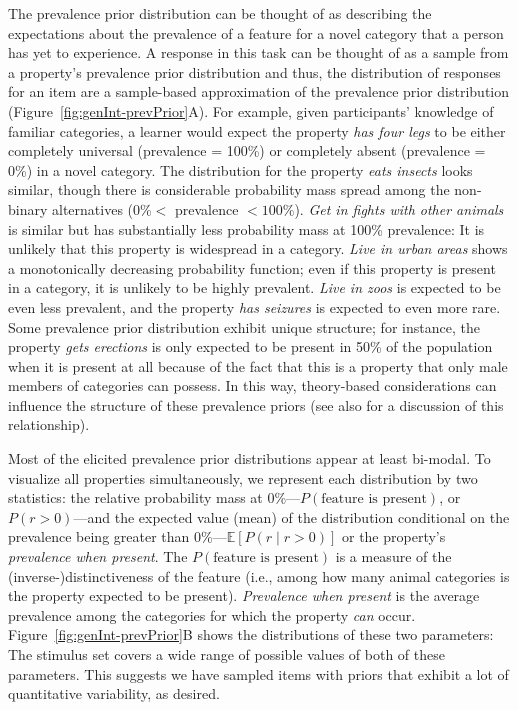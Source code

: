 \documentclass[floatsintext,doc]{apa6}
\begin{document}
The prevalence prior distribution can be thought of as describing the expectations about the prevalence of a feature for a novel category that a person has yet to experience. 
A response in this task can be thought of as a sample from a property's prevalence prior distribution and thus, the distribution of responses for an item are a sample-based approximation of the prevalence prior distribution (Figure~\ref{fig:genInt-prevPrior}A). 
For example, given participants' knowledge of familiar categories, a learner would expect the property \emph{has four legs} to be either completely universal (prevalence = 100\%) or completely absent (prevalence = 0\%) in a novel category.
The distribution for the property \emph{eats insects} looks similar, though there is considerable probability mass spread among the non-binary alternatives (\(0\% <\) prevalence \(< 100\%\)).
\emph{Get in fights with other animals} is similar but has substantially less probability mass at 100\% prevalence: It is unlikely that this property is widespread in a category.
\emph{Live in urban areas} shows a monotonically decreasing probability function; even if this property is present in a category, it is unlikely to be highly prevalent. 
\emph{Live in zoos} is expected to be even less prevalent, and the property \emph{has seizures} is expected to even more rare.
Some prevalence prior distribution exhibit unique structure; for instance,  the property \emph{gets erections} is only expected to be present in 50\% of the population when it is present at all because of the fact that this is a property that only male members of categories can possess. In this way, theory-based considerations can influence the structure of these prevalence priors (see also  for a discussion of this relationship). 

Most of the elicited prevalence prior distributions appear at least bi-modal.
To visualize all properties simultaneously, we represent each distribution by two statistics: the relative probability mass at 0\%---\(P(\text{feature is present})\), or \(P(r > 0)\)---and the expected value (mean) of the distribution conditional on the prevalence being greater than 0\%---\(\mathbb{E}[P(r \mid r>0)]\) or the property's \emph{prevalence when present}.
The $P(\text{feature is present})$ is a measure of the (inverse-)distinctiveness of the feature (i.e., among how many animal categories is the property expected to be present). 
\emph{Prevalence when present} is the average prevalence among the categories for which the property \emph{can} occur. 
Figure~\ref{fig:genInt-prevPrior}B shows the distributions of these two parameters: The stimulus set covers a wide range of possible values of both of these parameters.
This suggests we have sampled items with priors that exhibit a lot of quantitative variability, as desired.
\end{document}
